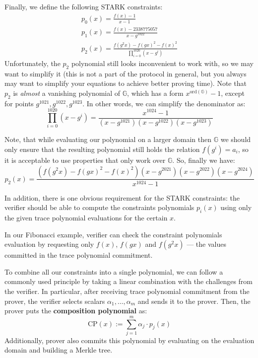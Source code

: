 \documentclass[../lecture-notes-148x210.tex]{subfiles}
\begin{document}
\begin{example}
Finally, we define the following STARK constraints:
\begin{gather*}
    p_0(x) = \frac{f(x)-1}{x - 1} \\
    p_1(x) = \frac{f(x) - 2338775057}{x - g^{1022}} \\
    p_2(x) = \frac{f(g^2x) - f(gx)^2 - f(x)^2}{\prod_{i=0}^{1020} (x - g^i)}
\end{gather*}
Unfortunately, the $p_2$ polynomial still looks inconvenient to work with, so we
may want to simplify it (this is not a part of the protocol in general, but you
always may want to simplify your equations to achieve better proving time). Note
that $p_2$ is \textit{almost} a vanishing polynomial of $\mathbb{G}$, which has
a form $x^{\text{ord}(\mathbb{G})} - 1$, except for points $g^{1021},
g^{1022}, g^{1023}$. In other words, we can simplify the denominator as:
\begin{equation*}
    \prod_{i=0}^{1020} (x - g^i) = \frac{x^{1024} - 1}{(x-g^{1021})(x-g^{1022})(x-g^{1023})}
\end{equation*}

Note, that while evaluating our polynomial on a larger domain
then $\mathbb{G}$ we should only ensure that the resulting polynomial still
holds the relation $f(g^i) = a_i$, so it is acceptable to use properties that
only work over $\mathbb{G}$. So, finally we have:
\begin{equation*}
p_2(x) = \frac{(f(g^2x) - f(gx)^2 - f(x)^2)(x - g^{2021})(x - g^{2022})(x - g^{2024})}{x^{1024} - 1}  
\end{equation*}
\end{example}

In addition, there is one obvious requirement for the STARK constraints: the
verifier should be able to compute the constraints polynomials $p_i(x)$ using
only the given trace polynomial evaluations for the certain $x$.

\begin{remark}
In our Fibonacci example, verifier can check the constraint polynomials
evaluation by requesting only $f(x)$, $f(gx)$ and $f(g^2x)$ --- the values
committed in the trace polynomial commitment.
\end{remark}

To combine all our constraints into a single polynomial, we can follow a
commonly used principle by taking a linear combination with the challenges from
the verifier. In particular, after receiving trace polynomial commitment from
the prover, the verifier selects scalars $\alpha_1,\dots,\alpha_m$ and sends it
to the prover. Then, the prover puts the \textbf{composition polynomial} as:
\begin{equation*}
\text{CP}(x) := \sum_{j = 1}^m \alpha_j\cdot p_j(x)
\end{equation*}
Additionally, prover also commits this polynomial by evaluating on the evaluation domain and building a Merkle tree.
\end{document}
